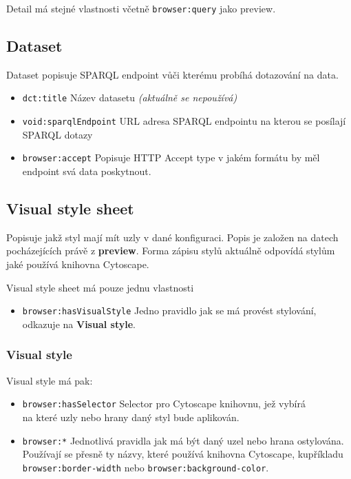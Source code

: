 Detail má stejné vlastnosti včetně \texttt{browser:query} jako preview.

\subsection{Dataset} \label{pozadavky-dataset}
Dataset popisuje SPARQL endpoint vůči kterému probíhá dotazování na data.

\begin{itemize}
    \item \texttt{dct:title} Název datasetu \textit{(aktuálně se nepoužívá)}
    \item \texttt{void:sparqlEndpoint} URL adresa SPARQL endpointu na kterou se posílají SPARQL dotazy
    \item \texttt{browser:accept} Popisuje HTTP Accept type v jakém formátu by měl endpoint svá data poskytnout. 
\end{itemize}

\subsection{Visual style sheet} \label{pozadavky-visual-style-sheet}
Popisuje jakž styl mají mít uzly v dané konfiguraci. Popis je založen na datech pocházejících právě z \textbf{preview}. Forma zápisu stylů aktuálně odpovídá stylům jaké používá knihovna Cytoscape.

Visual style sheet má pouze jednu vlastnosti

\begin{itemize}
    \item \texttt{browser:hasVisualStyle} Jedno pravidlo jak se má provést stylování, odkazuje na \textbf{Visual style}.
\end{itemize}

\subsubsection{Visual style}
Visual style má pak:

\begin{itemize}
    \item \texttt{browser:hasSelector} Selector pro Cytoscape knihovnu, jež vybírá \\ na které uzly nebo hrany daný styl bude aplikován.
    \item \texttt{browser:*} Jednotlivá pravidla jak má být daný uzel nebo hrana ostylována. Používají se přesně ty názvy, které používá knihovna Cytoscape, kupříkladu \texttt{browser:border-width} nebo \texttt{browser:background-color}.
\end{itemize}

